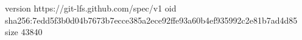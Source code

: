 version https://git-lfs.github.com/spec/v1
oid sha256:7edd5f3b0d04b7673b7ecce385a2ece92ffe93a60b4ef935992c2e81b7ad4d85
size 43840
